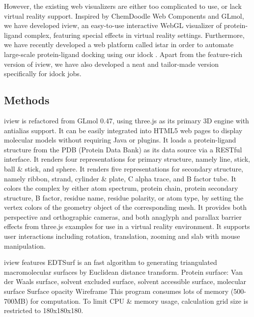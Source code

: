 \documentclass{bioinfo}
\begin{document}
However, the existing web visualizers are either too complicated to use, or lack virtual reality support. Inspired by ChemDoodle Web Components and GLmol, we have developed iview, an easy-to-use interactive WebGL visualizer of protein-ligand complex, featuring special effects in virtual reality settings. Furthermore, we have recently developed a web platform called istar in order to automate large-scale protein-ligand docking using our idock \citep{1153}. Apart from the feature-rich version of iview, we have also developed a neat and tailor-made version specifically for idock jobs.


\begin{methods}
\section{Methods}

iview is refactored from GLmol 0.47, using three.js as its primary 3D engine with antialias support. It can be easily integrated into HTML5 web pages to display molecular models without requiring Java or plugins. It loads a protein-ligand structure from the PDB (Protein Data Bank) \citep{539,537} as its data source via a RESTful interface. It renders four representations for primary structure, namely line, stick, ball \& stick, and sphere. It renders five representations for secondary structure, namely ribbon, strand, cylinder \& plate, C alpha trace, and B factor tube. It colors the complex by either atom spectrum, protein chain, protein secondary structure, B factor, residue name, residue polarity, or atom type, by setting the vertex colors of the geometry object of the corresponding mesh. It provides both perspective and orthographic cameras, and both anaglyph and parallax barrier effects from three.js examples for use in a virtual reality environment. It supports user interactions including rotation, translation, zooming and slab with mouse manipulation.

iview features EDTSurf \citep{1297} is an fast algorithm to generating triangulated macromolecular surfaces by Euclidean distance transform.
Protein surface: Van der Waals surface, solvent excluded surface, solvent accessible surface, molecular surface 
Surface opacity
Wireframe
This program consumes lots of memory (500-700MB) for computation. To limit CPU & memory usage, calculation grid size is restricted to 180x180x180.


\end{methods}
\end{document}
